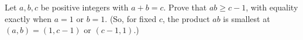 Let $a,b,c$ be positive integers with $a+b=c$. Prove that $ab\ge c-1$, with equality exactly when $a=1$ or $b=1$. (So, for fixed $c$, the product $ab$ is smallest at $(a,b)=(1,c-1)$ or $(c-1,1)$.)
